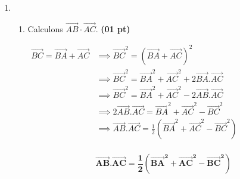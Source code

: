 \documentclass[12pt,a4paper]{article}
\begin{document}
\begin{enumerate}
    \item
          \begin{enumerate}
              \item Calculons \( \overrightarrow{AB} \cdot \overrightarrow{AC} \). \hfill
                    \textbf{(01 pt)}

                    \(
                    \begin{aligned}
                        \overrightarrow{BC}=\overrightarrow{BA}+\overrightarrow{AC} & \implies \overrightarrow{BC}^{2}=(\overrightarrow{BA}+\overrightarrow{AC})^{2}                                                                    \\
                                                                                    & \implies \overrightarrow{BC}^{2}=\overrightarrow{BA}^{2}+\overrightarrow{AC}^{2}+2\overrightarrow{BA}.\overrightarrow{AC}                         \\
                                                                                    & \implies \overrightarrow{BC}^{2}=\overrightarrow{BA}^{2}+\overrightarrow{AC}^{2}-2\overrightarrow{AB}.\overrightarrow{AC}                         \\
                                                                                    & \implies 2\overrightarrow{AB}.\overrightarrow{AC}=\overrightarrow{BA}^{2}+\overrightarrow{AC}^{2}-\overrightarrow{BC}^{2}                         \\
                                                                                    & \implies \overrightarrow{AB}.\overrightarrow{AC}=\frac{1}{2}\left( \overrightarrow{BA}^{2}+\overrightarrow{AC}^{2}-\overrightarrow{BC}^{2}\right) \\
                    \end{aligned}
                    \)

                    \begin{resultbox}
                        \[
                            \mathbf{\overrightarrow{AB}.\overrightarrow{AC}=\frac{1}{2}\left( \overrightarrow{BA}^{2}+\overrightarrow{AC}^{2}-\overrightarrow{BC}^{2}\right)}
                        \]
                    \end{resultbox}


\end{enumerate}
\end{enumerate}
\end{document}
